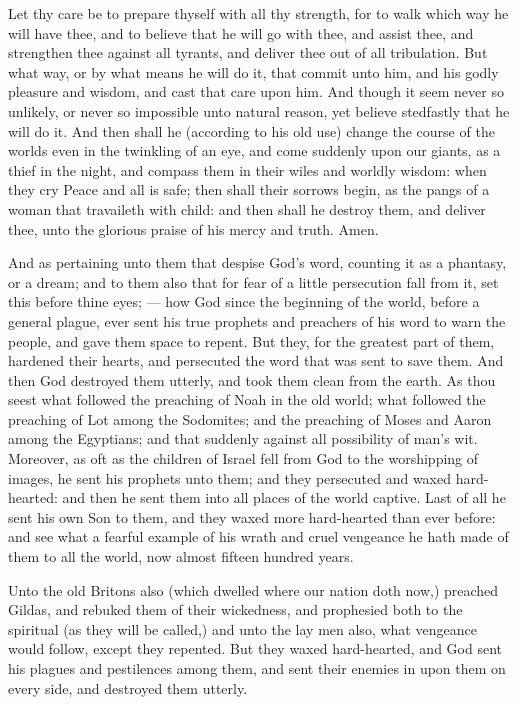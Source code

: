 Let thy care be to prepare thyself with all thy
strength, for to walk which way he will have
thee, and to believe that he will go with thee, 
and assist thee, and strengthen thee against all 
tyrants, and deliver thee out of all tribulation. 
But what way, or by what means he will do 
it, that commit unto him, and his godly pleasure 
and wisdom, and cast that care upon him. And 
though it seem never so unlikely, or never so 
impossible unto natural reason, yet believe stedfastly
that he will do it. And then shall he (according
to his old use) change the course of the 
worlds even in the twinkling of an eye, and come 
suddenly upon our giants, as a thief in the 
night, and compass them in their wiles and 
worldly wisdom: when they cry Peace and all is 
safe; then shall their sorrows begin, as the 
pangs of a woman that travaileth with child:
and then shall he destroy them, and deliver thee, 
unto the glorious praise of his mercy and truth. 
Amen. 


And as pertaining unto them that despise 
God's word, counting it as a phantasy, or a 
dream; and to them also that for fear of a little 
persecution fall from it, set this before thine 
eyes; — how God since the beginning of the 
world, before a general plague, ever sent his 
true prophets and preachers of his word to warn 
the people, and gave them space to repent. But 
they, for the greatest part of them, hardened 
their hearts, and persecuted the word that was 
sent to save them. And then God destroyed 
them utterly, and took them clean from the earth. 
As thou seest what followed the preaching of 
Noah in the old world; what followed the 
preaching of Lot among the Sodomites; and
the preaching of Moses and Aaron among the 
Egyptians; and that suddenly against all possibility
of man's wit. Moreover, as oft as the 
children of Israel fell from God to the worshipping
of images, he sent his prophets unto them;
and they persecuted and waxed hard-hearted:
and then he sent them into all places of the world 
captive. Last of all he sent his own Son to 
them, and they waxed more hard-hearted than 
ever before: and see what a fearful example of 
his wrath and cruel vengeance he hath made of 
them to all the world, now almost fifteen 
hundred years. 

Unto the old Britons also (which dwelled 
where our nation doth now,) preached Gildas, 
and rebuked them of their wickedness, and prophesied
both to the spiritual (as they will be 
called,) and unto the lay men also, what vengeance
would follow, except they repented. But 
they waxed hard-hearted, and God sent his 
plagues and pestilences among them, and sent 
their enemies in upon them on every side, and 
destroyed them utterly. 

